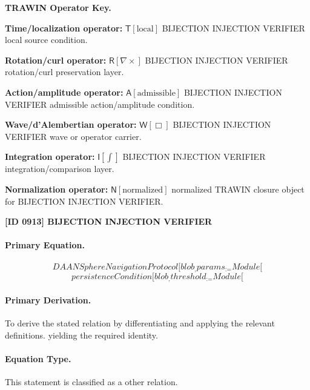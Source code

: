 \par\vspace{0.45\baselineskip}
\noindent\begin{minipage}[t]{\linewidth}
\begingroup
\small
\raggedright
\textbf{TRAWIN Operator Key.}\par
\noindent\textbf{Time/localization operator:} $\mathsf{T}\!\left[\mathrm{local}\right]$ BIJECTION INJECTION VERIFIER local source condition.\par
\noindent\textbf{Rotation/curl operator:} $\mathsf{R}\!\left[\nabla\times\right]$ BIJECTION INJECTION VERIFIER rotation/curl preservation layer.\par
\noindent\textbf{Action/amplitude operator:} $\mathsf{A}\!\left[\mathrm{admissible}\right]$ BIJECTION INJECTION VERIFIER admissible action/amplitude condition.\par
\noindent\textbf{Wave/d'Alembertian operator:} $\mathsf{W}\!\left[\Box\right]$ BIJECTION INJECTION VERIFIER wave or operator carrier.\par
\noindent\textbf{Integration operator:} $\mathsf{I}\!\left[\int\right]$ BIJECTION INJECTION VERIFIER integration/comparison layer.\par
\noindent\textbf{Normalization operator:} $\mathsf{N}\!\left[\mathrm{normalized}\right]$ normalized TRAWIN closure object for BIJECTION INJECTION VERIFIER.\par
\endgroup
\end{minipage}

\clearpage
\noindent\textbf{[ID 0913] BIJECTION INJECTION VERIFIER}\par
\vspace{0.35em}
\paragraph{Primary Equation.}
\[
DAANSphereNavigationProtocol[blob_, params_ := Module[
\]
\[
persistenceCondition[blob_, threshold_ := Module[
\]

\paragraph{Primary Derivation.}
To derive the stated relation by differentiating and applying the relevant definitions. yielding the required identity.
\paragraph{Equation Type.}
This statement is classified as a other relation.

